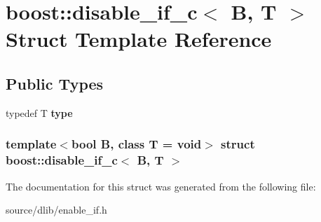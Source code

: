 \hypertarget{structboost_1_1disable__if__c}{
\section{boost::disable\_\-if\_\-c$<$ B, T $>$ Struct Template Reference}
\label{structboost_1_1disable__if__c}
}
\subsection*{Public Types}
\begin{DoxyCompactItemize}
\item 
\hypertarget{structboost_1_1disable__if__c_a529518c194583fcf22a4f2417a07ead5}{
typedef T {\bfseries type}}
\label{structboost_1_1disable__if__c_a529518c194583fcf22a4f2417a07ead5}

\end{DoxyCompactItemize}
\subsubsection*{template$<$bool B, class T = void$>$ struct boost::disable\_\-if\_\-c$<$ B, T $>$}



The documentation for this struct was generated from the following file:\begin{DoxyCompactItemize}
\item 
source/dlib/enable\_\-if.h\end{DoxyCompactItemize}
